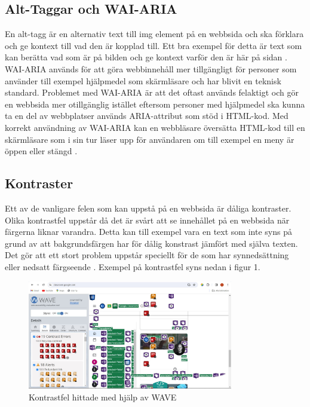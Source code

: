 \documentclass[11p]{article}
\begin{document}
    \subsection{Alt-Taggar och WAI-ARIA}
    En alt-tagg är en alternativ text till img element på en webbsida och ska förklara och ge kontext till vad den är kopplad till.
    Ett bra exempel för detta är text som kan berätta vad som är på bilden och ge kontext varför den är här på sidan \textcite{Nordström}.
    WAI-ARIA används för att göra webbinnehåll mer tillgängligt för personer som använder till exempel hjälpmedel som skärmläsare och har blivit en teknisk standard. \textcite{ARIA}
    Problemet med WAI-ARIA är att det oftast används felaktigt och gör en webbsida mer otillgänglig istället eftersom personer med hjälpmedel ska kunna ta en del av webbplatser används ARIA-attribut som stöd i HTML-kod.
    Med korrekt användning av WAI-ARIA kan en webbläsare översätta HTML-kod till en skärmläsare som i sin tur läser upp för användaren om till exempel en meny är öppen eller stängd \textcite{7minds}.


    \subsection{Kontraster}
    Ett av de vanligare felen som kan uppstå på en webbsida är dåliga kontraster.
    Olika kontrastfel uppstår då det är svårt att se innehållet på en webbsida när färgerna liknar varandra.
    Detta kan till exempel vara en text som inte syns på grund av att bakgrundsfärgen har för dålig konstrast jämfört med själva texten.
    Det gör att ett stort problem uppstår speciellt för de som har synnedsättning eller nedsatt färgseende \textcite{Digg_2021}.
    Exempel på kontrastfel syns nedan i figur 1.

    \begin{figure}[hbt!]
        \includegraphics[width=0.8\textwidth]{../images/KontrastExempel.jpg}
        \caption{ Kontrastfel hittade med hjälp av WAVE }
    \end{figure}
\end{document}

